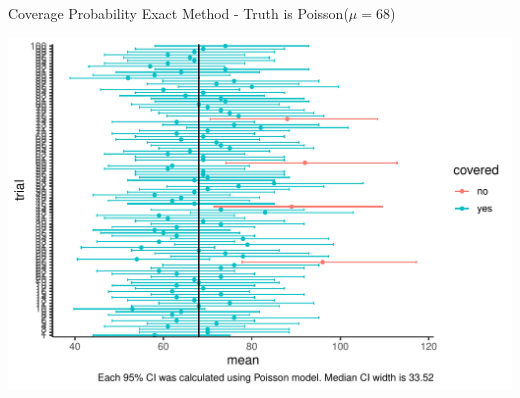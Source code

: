 \documentclass[10pt]{beamer}\usepackage[]{graphicx}\usepackage[]{color}
\makeatletter
\def\maxwidth{ %
  \ifdim\Gin@nat@width>\linewidth
    \linewidth
  \else
    \Gin@nat@width
  \fi
}
\newenvironment{knitrout}{}{} %
\makeatother
\begin{document}
\begin{frame}[fragile]{Coverage Probability Exact Method - Truth is Poisson($\mu=68$)}
	
\begin{knitrout}\tiny
{}\color{fgcolor}

{\centering \includegraphics[width=\maxwidth]{figure/unnamed-chunk-7-1} 

}



\end{knitrout}
	
\end{frame}








\end{document}
